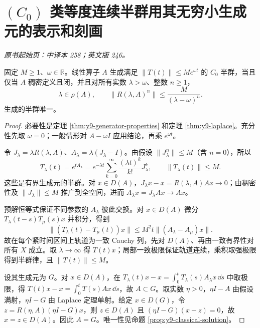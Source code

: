 \section{\texorpdfstring{$(C_0)$}{(C0)} 类等度连续半群用其无穷小生成元的表示和刻画}\label{sec:yosida-09-07}
\noindent\textit{原书起始页：中译本 258；英文版 246。}

\begin{theorem}\label{thm:y9-hille-yosida}
固定 $M\ge1$、$\omega\in\mathbb R$。线性算子 $A$ 生成满足 $\|T(t)\|\le Me^{\omega t}$ 的 $C_0$ 半群，当且仅当 $A$ 稠密定义且闭，并且对所有实数 $\lambda>\omega$、整数 $n\ge1$，
\begin{equation}\label{eq:y9-hille-yosida}
 \lambda\in\rho(A),\qquad
 \|R(\lambda,A)^n\|\le\frac{M}{(\lambda-\omega)^n}.
\end{equation}
生成的半群唯一。
\end{theorem}
\begin{proof}
必要性是定理 \ref{thm:y9-generator-properties} 和定理 \ref{thm:y9-laplace}。充分性先取 $\omega=0$；一般情形对 $A-\omega I$ 应用结论，再乘 $e^{\omega t}$。

令 $J_\lambda=\lambda R(\lambda,A)$、$A_\lambda=\lambda(J_\lambda-I)$。由假设 $\|J_\lambda^n\|\le M$（含 $n=0$），所以
\begin{equation}\label{eq:y9-yosida-semigroup}
 T_\lambda(t)=e^{tA_\lambda}
 =e^{-\lambda t}\sum_{k=0}^\infty\frac{(\lambda t)^k}{k!}J_\lambda^k,
 \qquad \|T_\lambda(t)\|\le M.
\end{equation}
这些是有界生成元的半群。对 $x\in D(A)$，$J_\lambda x-x=R(\lambda,A)Ax\to0$；由稠密性及 $\|J_\lambda\|\le M$ 推广到全空间，进而 $A_\lambda x=J_\lambda Ax\to Ax$。

预解恒等式保证不同参数的 $A_\lambda$ 彼此交换。对 $x\in D(A)$ 微分 $T_\lambda(t-s)T_\mu(s)x$ 并积分，得到
\[
 \|(T_\lambda(t)-T_\mu(t))x\|
 \le M^2t\|(A_\lambda-A_\mu)x\|.
\]
故在每个紧时间区间上轨道为一致 Cauchy 列，先对 $D(A)$、再由一致有界性对所有 $X$ 成立。取 $\lambda\to\infty$ 得 $T(t)x$；局部一致极限保证轨道连续，乘积取强极限得到半群律，且 $\|T(t)\|\le M$。

设其生成元为 $G$。对 $x\in D(A)$，在
$T_\lambda(t)x-x=\int_0^tT_\lambda(s)A_\lambda x\,\dd s$ 中取极限，得 $T(t)x-x=\int_0^tT(s)Ax\,\dd s$，故 $A\subset G$。取实数 $\eta>0$，$\eta I-A$ 由假设满射，$\eta I-G$ 由 Laplace 定理单射。给定 $x\in D(G)$，令 $z=R(\eta,A)(\eta I-G)x$，则 $z\in D(A)$ 且 $(\eta I-G)(x-z)=0$，故 $x=z\in D(A)$。因此 $A=G$。唯一性见命题 \ref{prop:y9-classical-solution}。
\end{proof}

